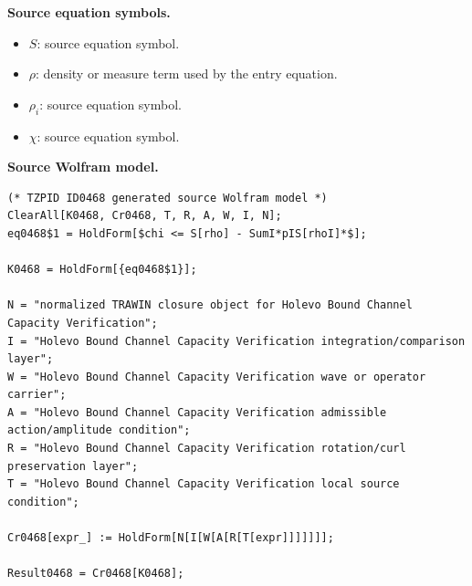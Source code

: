 \begin{minipage}[t]{0.49\linewidth}
\begingroup
\small
\raggedright
\textbf{Source equation symbols.}\par
\begin{itemize}[leftmargin=1.35em,itemsep=1pt,topsep=1pt,parsep=0pt]
    \item $S$: source equation symbol.
    \item $\rho$: density or measure term used by the entry equation.
    \item $\rho_i$: source equation symbol.
    \item $\chi$: source equation symbol.
\end{itemize}
\endgroup
\end{minipage}\hfill
\begin{minipage}[t]{0.47\linewidth}
\begingroup
\scriptsize
\raggedright
\textbf{Source Wolfram model.}\par
\begin{Verbatim}[fontsize=\tiny,breaklines=true,breakanywhere=true]
(* TZPID ID0468 generated source Wolfram model *)
ClearAll[K0468, Cr0468, T, R, A, W, I, N];
eq0468$1 = HoldForm[$chi <= S[rho] - SumI*pIS[rhoI]*$];

K0468 = HoldForm[{eq0468$1}];

N = "normalized TRAWIN closure object for Holevo Bound Channel Capacity Verification";
I = "Holevo Bound Channel Capacity Verification integration/comparison layer";
W = "Holevo Bound Channel Capacity Verification wave or operator carrier";
A = "Holevo Bound Channel Capacity Verification admissible action/amplitude condition";
R = "Holevo Bound Channel Capacity Verification rotation/curl preservation layer";
T = "Holevo Bound Channel Capacity Verification local source condition";

Cr0468[expr_] := HoldForm[N[I[W[A[R[T[expr]]]]]]];

Result0468 = Cr0468[K0468];
\end{Verbatim}
\endgroup
\end{minipage}


